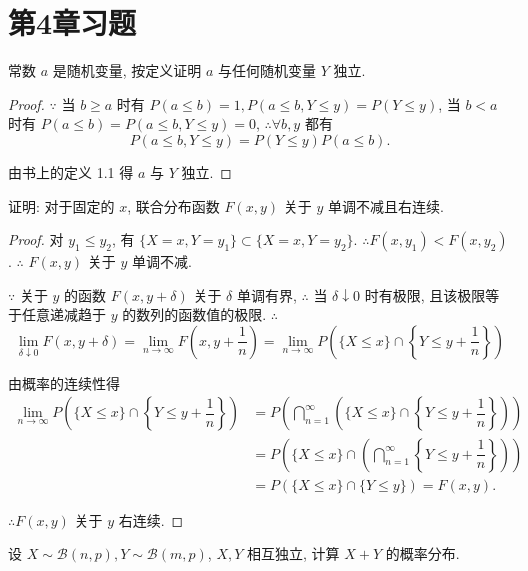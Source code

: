 \documentclass[color=black,device=normal,lang=cn]{elegantnote}
\numberwithin{equation}{section}
\theoremstyle{plain}
\newcounter{exsection}[section]
\numberwithin{exercise}{exsection}
\begin{document}
\section{第4章习题}
\addtocounter{exsection}{4}
\addtocounter{exercise}{3}
\begin{exercise}%
    常数 $a$ 是随机变量, 按定义证明 $a$ 与任何随机变量 $Y$ 独立.
\end{exercise}
\begin{proof}
    $\because$ 当 $b\geq a$ 时有 $P(a\leq b)=1,P(a\leq b,Y\leq y)=P(Y\leq y)$, 当 $b<a$ 时有 $P(a\leq b)=P(a\leq b,Y\leq y)=0$, $\therefore\forall b,y$ 都有
    \[P(a\leq b,Y\leq y)=P(Y\leq y)P(a\leq b).\]

    由书上的定义 1.1 得 $a$ 与 $Y$ 独立.
\end{proof}
\begin{exercise}%
    证明: 对于固定的 $x$, 联合分布函数 $F(x,y)$ 关于 $y$ 单调不减且右连续.
\end{exercise}
\begin{proof}
    对 $y_1\leq y_2$, 有 $\{X=x,Y=y_1\}\subset\{X=x,Y=y_2\}$. $\therefore F(x,y_1)<F(x,y_2)$. $\therefore$ $F(x,y)$ 关于 $y$ 单调不减.

    $\because$ 关于 $y$ 的函数 $F(x,y+\delta)$ 关于 $\delta$ 单调有界, $\therefore$ 当 $\delta\downarrow0$ 时有极限, 且该极限等于任意递减趋于 $y$ 的数列的函数值的极限. $\therefore$
    \[\lim\limits_{\delta\downarrow0}F(x,y+\delta)=\lim\limits_{n\to\infty}F\left(x,y+\dfrac{1}{n}\right)=\lim\limits_{n\to\infty}P\left(\{X\leq x\}\cap\left\{Y\leq y+\dfrac{1}{n}\right\}\right)\]

    由概率的连续性得
    \begin{align*}
        \lim\limits_{n\to\infty}P\left(\{X\leq x\}\cap\left\{Y\leq y+\dfrac{1}{n}\right\}\right) & =P\left(\bigcap\limits_{n=1}^\infty\left(\{X\leq x\}\cap\left\{Y\leq y+\dfrac{1}{n}\right\}\right)\right) \\
        & =P\left(\{X\leq x\}\cap\left(\bigcap\limits_{n=1}^\infty\left\{Y\leq y+\dfrac{1}{n}\right\}\right)\right) \\
        & =P(\{X\leq x\}\cap\{Y\leq y\})=F(x,y).
    \end{align*}

    $\therefore F(x,y)$ 关于 $y$ 右连续.
\end{proof}
\begin{exercise}%
    设 $X\sim\mathcal{B}(n,p),Y\sim\mathcal{B}(m,p)$, $X,Y$ 相互独立, 计算 $X+Y$ 的概率分布.
\end{exercise}
\end{document}
